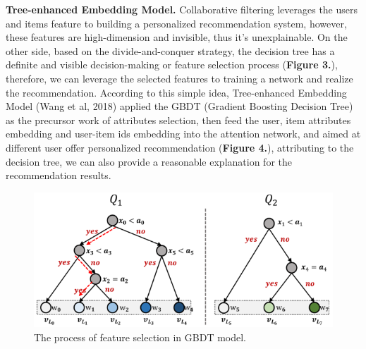 \documentclass[10pt,twocolumn,letterpaper]{article}
\begin{document}
{\bf Tree-enhanced Embedding Model.} Collaborative filtering leverages the users and items feature to building a personalized recommendation system, however, these features are high-dimension and invisible, thus it's unexplainable. On the other side, based on the divide-and-conquer strategy, the decision tree has a definite and visible decision-making or feature selection process ({\bf Figure 3.}), therefore, we can leverage the selected features to training a network and realize the recommendation. According to this simple idea, Tree-enhanced Embedding Model (Wang et al, 2018) applied the GBDT (Gradient Boosting Decision Tree) as the precursor work of attributes selection, then feed the  user, item attributes embedding and user-item ids embedding into the attention network, and aimed at different user offer personalized recommendation ({\bf Figure 4.}), attributing to the decision tree, we can also provide a reasonable explanation for the recommendation results.
\begin{figure}
	\begin{center}
		\includegraphics[width=0.8\linewidth]{TEM_1.png}
	\end{center}
	\caption{The process of feature selection in GBDT model.}
	\label{fig:long}
	\label{fig:onecol}
\end{figure}
\end{document}
